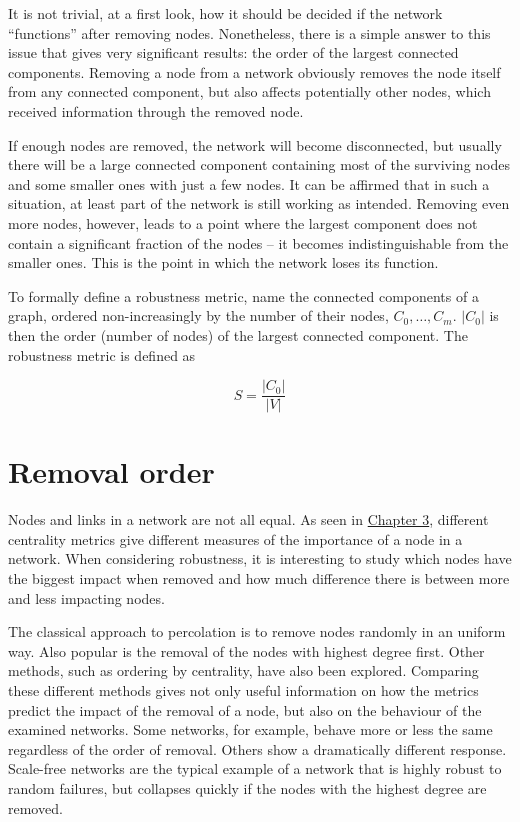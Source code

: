 \documentclass[a4paper,11pt,twoside,openright]{memoir}
\begin{document}
It is not trivial, at a first look, how it should be decided if the
network ``functions'' after removing nodes. Nonetheless, there is a
simple answer to this issue that gives very significant results: the
order of the largest connected components. Removing a node from a
network obviously removes the node itself from any connected component,
but also affects potentially other nodes, which received information
through the removed node.

If enough nodes are removed, the network will become disconnected, but
usually there will be a large connected component containing most of the
surviving nodes and some smaller ones with just a few nodes. It can be
affirmed that in such a situation, at least part of the network is still
working as intended. Removing even more nodes, however, leads to a point
where the largest component does not contain a significant fraction of
the nodes -- it becomes indistinguishable from the smaller ones. This is
the point in which the network loses its function.

To formally define a robustness metric, name the connected components of
a graph, ordered non-increasingly by the number of their nodes,
$C_0, \ldots, C_m$. $|C_0|$ is then the order (number of nodes) of the
largest connected component. The robustness metric is defined as

\begin{equation}
S = \frac{|C_0|}{|V|}
\end{equation}

\section{Removal order}\label{removal-order}

Nodes and links in a network are not all equal. As seen in
\hyperref[network-topology-and-graphs]{Chapter 3}, different
centrality metrics give different measures of the importance of a node
in a network. When considering robustness, it is interesting to study
which nodes have the biggest impact when removed and how much difference
there is between more and less impacting nodes.

The classical approach to percolation is to remove nodes randomly in an
uniform way. Also popular is the removal of the nodes with highest
degree first. Other methods, such as ordering by centrality, have also
been explored. Comparing these different methods gives not only useful
information on how the metrics predict the impact of the removal of a node,
but also on the behaviour of the examined networks. Some
networks, for example, behave more or less the same regardless of the
order of removal. Others show a dramatically different response.
Scale-free networks are the typical example of a network that is highly
robust to random failures, but collapses quickly if the nodes with the
highest degree are removed.
\end{document}
